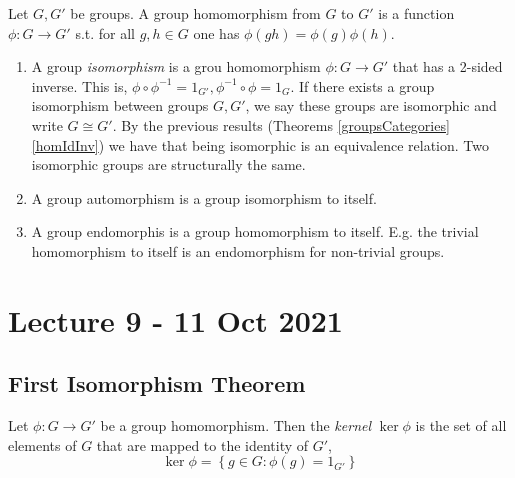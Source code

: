 \documentclass[11pt]{scrartcl}
\begin{document}
\begin{definition}
  Let $G,G'$ be groups. A group homomorphism from $G$ to $G'$ is a function $\phi:G\to G'$
  s.t. for all $g,h\in G$ one has $\phi(gh)=\phi(g) \phi(h)$.
  \label{groupHomomorphism}
\end{definition}

\begin{definition}
  \begin{enumerate}
    \item A group \emph{isomorphism} is a grou homomorphism $\phi:G\to G'$ that has a
      2-sided inverse. This is, $\phi\circ\phi^{-1}=1_{G'},\phi^{-1}\circ\phi=1_G$. If
      there exists a group isomorphism between groups $G,G'$, we say these groups are
      isomorphic and write $G\cong G'$. By the previous results (Theorems
      \ref{groupsCategories} \ref{homIdInv}) we have that being isomorphic is an
      equivalence relation. Two isomorphic groups are structurally the same.

    \item A group automorphism is a group isomorphism to itself.
    \item A group endomorphis is a group homomorphism to itself. E.g. the trivial
      homomorphism to itself is an endomorphism for non-trivial groups.
  \end{enumerate}
  \label{morphismZoo}
\end{definition}

\section{Lecture 9 - 11 Oct 2021}

\subsection{First Isomorphism Theorem}

\begin{definition} 
  Let $\phi:G\to G'$ be a group homomorphism. Then the \emph{kernel} $\ker\phi$ is the set
  of all elements of $G$ that are mapped to the identity of $G'$,
  \[\ker \phi = \left\{ g\in G : \phi(g)=1_{G'} \right\}\]
  \label{kernel}
\end{definition}
\end{document}

